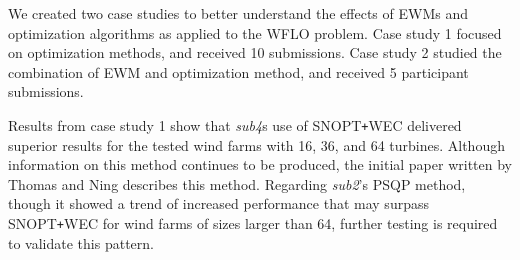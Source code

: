 

We created two case studies to better understand the effects of EWMs and optimization algorithms as applied to the WFLO problem.
Case study 1 focused on optimization methods, and received 10 submissions. 
Case study 2 studied the combination of EWM and optimization method, and received 5 participant submissions.

Results from case study 1 show that \textit{sub4}s use of SNOPT\texttt{+}WEC delivered superior results for the tested wind farms with 16, 36, and 64 turbines.
Although information on this method continues to be produced, the initial paper written by Thomas and Ning \cite{ThomasNing2018} describes this method.
Regarding \textit{sub2}'s PSQP method, though it showed a trend of increased performance that may surpass SNOPT\texttt{+}WEC for wind farms of sizes larger than 64, further testing is required to validate this pattern.


